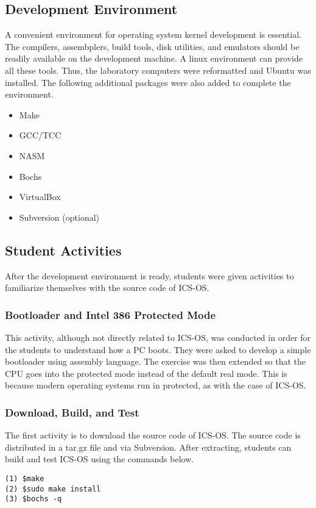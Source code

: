\documentclass{acm_proc_article-sp}
\begin{document}
\subsection{Development Environment}
A convenient environment for operating system kernel development is essential.
The compilers, assembplers, build tools, disk utilities, and emulators should
be readily available on the development machine. A linux environment can 
provide all these tools. Thus, the laboratory computers were reformatted and
Ubuntu was installed. The following additional packages were also added to 
complete the environment.
\begin{itemize}
 \item Make
 \item GCC/TCC
 \item NASM
 \item Bochs
 \item VirtualBox
 \item Subversion (optional)
\end{itemize}

\subsection{Student Activities}
After the development environment is ready, students were given activities
to familiarize themselves with the source code of ICS-OS.

\subsubsection{Bootloader and Intel 386 Protected Mode}
This activity, although not directly related to ICS-OS, was conducted in order
for the students to understand how a PC boots. They were asked to develop a
simple bootloader using assembly language. The exercise was then extended so
that the CPU goes into the protected mode instead of the default real mode.
This is because modern operating systems run in protected, as with the case
of ICS-OS.

\subsubsection{Download, Build, and Test}
The first activity is to download the source code of ICS-OS\cite{icsos:site}.
The source code is distributed in a tar.gz file and via Subversion. 
After extracting, students can  build and test ICS-OS using the commands below.
\begin{verbatim}
(1) $make
(2) $sudo make install
(3) $bochs -q
\end{verbatim}
\end{document}
